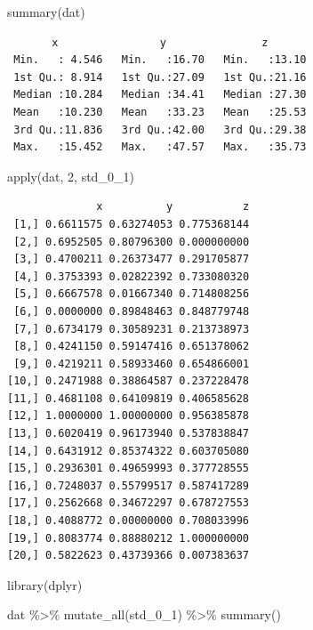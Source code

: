 \documentclass[
  letterpaper,
  DIV=11,
  numbers=noendperiod]{scrreprt}
\newenvironment{Shaded}{\begin{snugshade}}{\end{snugshade}}
\newcommand{\DecValTok}[1]{\textcolor[rgb]{0.68,0.00,0.00}{#1}}
\newcommand{\FunctionTok}[1]{\textcolor[rgb]{0.28,0.35,0.67}{#1}}
\newcommand{\NormalTok}[1]{\textcolor[rgb]{0.00,0.23,0.31}{#1}}
\newcommand{\SpecialCharTok}[1]{\textcolor[rgb]{0.37,0.37,0.37}{#1}}
\begin{document}
\begin{Shaded}
\begin{Highlighting}[]
\FunctionTok{summary}\NormalTok{(dat)}
\end{Highlighting}
\end{Shaded}

\begin{verbatim}
       x                y               z        
 Min.   : 4.546   Min.   :16.70   Min.   :13.10  
 1st Qu.: 8.914   1st Qu.:27.09   1st Qu.:21.16  
 Median :10.284   Median :34.41   Median :27.30  
 Mean   :10.230   Mean   :33.23   Mean   :25.53  
 3rd Qu.:11.836   3rd Qu.:42.00   3rd Qu.:29.38  
 Max.   :15.452   Max.   :47.57   Max.   :35.73  
\end{verbatim}

\begin{Shaded}
\begin{Highlighting}[]
\FunctionTok{apply}\NormalTok{(dat, }\DecValTok{2}\NormalTok{, std\_0\_1)}
\end{Highlighting}
\end{Shaded}

\begin{verbatim}
              x          y           z
 [1,] 0.6611575 0.63274053 0.775368144
 [2,] 0.6952505 0.80796300 0.000000000
 [3,] 0.4700211 0.26373477 0.291705877
 [4,] 0.3753393 0.02822392 0.733080320
 [5,] 0.6667578 0.01667340 0.714808256
 [6,] 0.0000000 0.89848463 0.848779748
 [7,] 0.6734179 0.30589231 0.213738973
 [8,] 0.4241150 0.59147416 0.651378062
 [9,] 0.4219211 0.58933460 0.654866001
[10,] 0.2471988 0.38864587 0.237228478
[11,] 0.4681108 0.64109819 0.406585628
[12,] 1.0000000 1.00000000 0.956385878
[13,] 0.6020419 0.96173940 0.537838847
[14,] 0.6431912 0.85374322 0.603705080
[15,] 0.2936301 0.49659993 0.377728555
[16,] 0.7248037 0.55799517 0.587417289
[17,] 0.2562668 0.34672297 0.678727553
[18,] 0.4088772 0.00000000 0.708033996
[19,] 0.8083774 0.88880212 1.000000000
[20,] 0.5822623 0.43739366 0.007383637
\end{verbatim}

\begin{Shaded}
\begin{Highlighting}[]
\FunctionTok{library}\NormalTok{(dplyr)}

\NormalTok{dat }\SpecialCharTok{\%\textgreater{}\%} \FunctionTok{mutate\_all}\NormalTok{(std\_0\_1) }\SpecialCharTok{\%\textgreater{}\%} \FunctionTok{summary}\NormalTok{()}
\end{Highlighting}
\end{Shaded}
\end{document}
